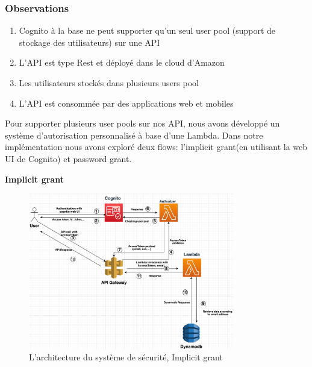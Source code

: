 \subsubsection{Observations}
\begin{enumerate}
\item Cognito à la base ne peut supporter qu'un seul user pool (support de stockage des utilisateurs) sur une API
\item L'API  est  type Rest et déployé dans le cloud d'Amazon
\item Les utilisateurs  stockés dans  plusieurs users pool
\item L'API est consommée par des applications web et  mobiles
\end{enumerate}
Pour supporter plusieurs user pools sur nos API, nous avons développé un système d'autorisation personnalisé à base d'une Lambda. Dans notre implémentation nous avons exploré deux flows: l'implicit grant(en utilisant la web UI de Cognito) et password grant.

\textbf{Implicit grant}
 \begin{figure}[H]
            \centering
                \includegraphics[width=0.8\textwidth]{Figures/securite}
	       \decoRule
		\caption[L'architecture du système de sécurité, Implicit grant]{L'architecture du système de sécurité, Implicit grant}
	\label{fig:L'architecture du système de sécurité, Implicit grant}
	\end{figure}
 
